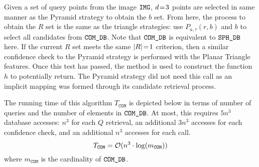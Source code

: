 Given a set of query points from the image $\texttt{IMG}$, $d \!=\! 3$ points are selected in same manner as the Pyramid strategy to obtain the $b$ set.
From here, the process to obtain the $R$ set is the same as the triangle strategies: use $P_{a, \tau}(r, b)$ and $b$ to select all candidates from $\texttt{COM\_DB}$.
Note that $\texttt{COM\_DB}$ is equivalent to $\texttt{SPH\_DB}$ here.
If the current $R$ set meets the same $\left| R \right| \!=\! 1$ criterion, then a similar confidence check to the Pyramid strategy is performed with the Planar Triangle features.
Once this test has passed, the  method is used to construct the function $h$ to potentially return.
The Pyramid strategy did not need this call as an implicit mapping was formed through its candidate retrieval process.

The running time of this algorithm $T_{\texttt{COM}}$ is depicted below in terms of number of queries and the number of elements in $\texttt{COM\_DB}$.
At most, this requires $5n^3$ database accesses: $n^3$ for each $Q$ retrieval, an additional $3n^3$ accesses for each confidence check, and an additional $n^3$ accesses for each  call.
\begin{equation}
    T_{\texttt{COM}} = \mathcal{O} (n^3 \cdot \log(m_\texttt{COM}))
\end{equation}
where $m_\texttt{COM}$ is the cardinality of $\texttt{COM\_DB}$.


%    
